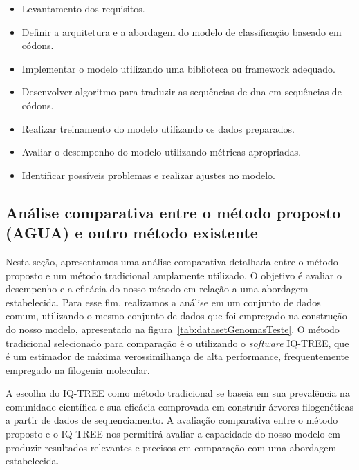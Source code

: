 \begin{itemize}
  \item Levantamento dos requisitos.
  \item Definir a arquitetura e a abordagem do modelo de classificação baseado em códons.
  \item Implementar o modelo utilizando uma biblioteca ou framework adequado.
  \item Desenvolver algoritmo para traduzir as sequências de \gls{dna} em sequências de códons.
  \item Realizar treinamento do modelo utilizando os dados preparados.
  \item Avaliar o desempenho do modelo utilizando métricas apropriadas.
  \item Identificar possíveis problemas e realizar ajustes no modelo.
\end{itemize}

\subsection{Análise comparativa entre o método proposto (AGUA) e outro método existente}

Nesta seção, apresentamos uma análise comparativa detalhada entre o método proposto e um método tradicional amplamente utilizado. O objetivo é avaliar o desempenho e a eficácia do nosso método em relação a uma abordagem estabelecida. Para esse fim, realizamos a análise em um conjunto de dados comum, utilizando o mesmo conjunto de dados que foi empregado na construção do nosso modelo, apresentado na figura~\ref{tab:datasetGenomasTeste}. O método tradicional selecionado para comparação é o utilizando o \textit{software} IQ-TREE, que é um estimador de máxima verossimilhança de alta performance, frequentemente empregado na filogenia molecular.~\cite{iqtree2_minh_2020}

A escolha do IQ-TREE como método tradicional se baseia em sua prevalência na comunidade científica e sua eficácia comprovada em construir árvores filogenéticas a partir de dados de sequenciamento. A avaliação comparativa entre o método proposto e o IQ-TREE nos permitirá avaliar a capacidade do nosso modelo em produzir resultados relevantes e precisos em comparação com uma abordagem estabelecida.

